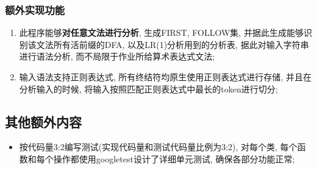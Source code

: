 \subsubsection{额外实现功能}
\begin{enumerate}
	\item 此程序能够\textbf{对任意文法进行分析}, 生成FIRST, FOLLOW集,
	      并据此生成能够识别该文法所有活前缀的DFA, 以及LR(1)分析用到的分析表,
	      据此对输入字符串进行语法分析, 而不局限于作业所给算术表达式文法;
	\item 输入语法支持正则表达式, 所有终结符均原生使用正则表达式进行存储,
	      并且在分析输入的时候, 将输入按照匹配正则表达式中最长的token进行切分;
\end{enumerate}

\subsection{其他额外内容}
\begin{itemize}
	\item 按代码量3:2编写测试(实现代码量和测试代码量比例为3:2), 对每个类,
	      每个函数和每个操作都使用googletest设计了详细单元测试, 确保各部分功能正常;
\end{itemize}
